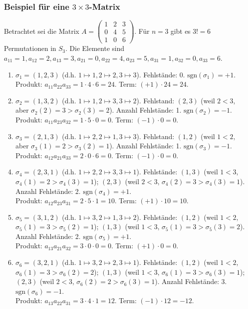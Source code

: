 \subsubsection*{Beispiel für eine $3 \times 3$-Matrix}
Betrachtet sei die Matrix $A = \begin{pmatrix} 1 & 2 & 3 \\ 0 & 4 & 5 \\ 1 & 0 & 6 \end{pmatrix}$.
Für $n=3$ gibt es $3! = 6$ Permutationen in $S_3$. Die Elemente sind $a_{11}=1, a_{12}=2, a_{13}=3, a_{21}=0, a_{22}=4, a_{23}=5, a_{31}=1, a_{32}=0, a_{33}=6$.

\begin{enumerate}
    \item $\sigma_1 = (1,2,3)$ (d.h. $1 \mapsto 1, 2 \mapsto 2, 3 \mapsto 3$). Fehlstände: 0. $\text{sgn}(\sigma_1)=+1$. \\
    Produkt: $a_{11}a_{22}a_{33} = 1 \cdot 4 \cdot 6 = 24$. Term: $(+1) \cdot 24 = 24$.
    \item $\sigma_2 = (1,3,2)$ (d.h. $1 \mapsto 1, 2 \mapsto 3, 3 \mapsto 2$). Fehlstand: $(2,3)$ (weil $2<3$, aber $\sigma_2(2)=3 > \sigma_2(3)=2$). Anzahl Fehlstände: 1. $\text{sgn}(\sigma_2)=-1$. \\
    Produkt: $a_{11}a_{23}a_{32} = 1 \cdot 5 \cdot 0 = 0$. Term: $(-1) \cdot 0 = 0$.
    \item $\sigma_3 = (2,1,3)$ (d.h. $1 \mapsto 2, 2 \mapsto 1, 3 \mapsto 3$). Fehlstand: $(1,2)$ (weil $1<2$, aber $\sigma_3(1)=2 > \sigma_3(2)=1$). Anzahl Fehlstände: 1. $\text{sgn}(\sigma_3)=-1$. \\
    Produkt: $a_{12}a_{21}a_{33} = 2 \cdot 0 \cdot 6 = 0$. Term: $(-1) \cdot 0 = 0$.
    \item $\sigma_4 = (2,3,1)$ (d.h. $1 \mapsto 2, 2 \mapsto 3, 3 \mapsto 1$). Fehlstände: $(1,3)$ (weil $1<3$, $\sigma_4(1)=2 > \sigma_4(3)=1$); $(2,3)$ (weil $2<3$, $\sigma_4(2)=3 > \sigma_4(3)=1$). Anzahl Fehlstände: 2. $\text{sgn}(\sigma_4)=+1$. \\
    Produkt: $a_{12}a_{23}a_{31} = 2 \cdot 5 \cdot 1 = 10$. Term: $(+1) \cdot 10 = 10$.
    \item $\sigma_5 = (3,1,2)$ (d.h. $1 \mapsto 3, 2 \mapsto 1, 3 \mapsto 2$). Fehlstände: $(1,2)$ (weil $1<2$, $\sigma_5(1)=3 > \sigma_5(2)=1$); $(1,3)$ (weil $1<3$, $\sigma_5(1)=3 > \sigma_5(3)=2$). Anzahl Fehlstände: 2. $\text{sgn}(\sigma_5)=+1$. \\
    Produkt: $a_{13}a_{21}a_{32} = 3 \cdot 0 \cdot 0 = 0$. Term: $(+1) \cdot 0 = 0$.
    \item $\sigma_6 = (3,2,1)$ (d.h. $1 \mapsto 3, 2 \mapsto 2, 3 \mapsto 1$). Fehlstände: $(1,2)$ (weil $1<2$, $\sigma_6(1)=3 > \sigma_6(2)=2$); $(1,3)$ (weil $1<3$, $\sigma_6(1)=3 > \sigma_6(3)=1$); $(2,3)$ (weil $2<3$, $\sigma_6(2)=2 > \sigma_6(3)=1$). Anzahl Fehlstände: 3. $\text{sgn}(\sigma_6)=-1$. \\
    Produkt: $a_{13}a_{22}a_{31} = 3 \cdot 4 \cdot 1 = 12$. Term: $(-1) \cdot 12 = -12$.
\end{enumerate}
